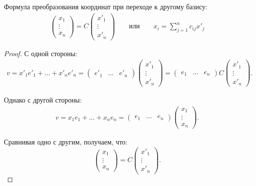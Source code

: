 \begin{Suggestion}
Формула преобразования координат при переходе к другому базису:
\begin{gather*}
\begin{pmatrix*}
x_1 \\
\vdots \\
x_n
\end{pmatrix*}
= C 
\begin{pmatrix*}
x'_1 \\
\vdots \\
x'_n
\end{pmatrix*}
\qquad \text{или} \qquad
x_i = \sum_{j = 1}^{n}c_{ij}x'_j
\end{gather*}
\end{Suggestion}

\begin{proof}
С одной стороны:
\begin{gather*}
v = x'_1 e'_1 + \ldots + x'_ne'_n = 
\begin{pmatrix*}
e'_1 & \ldots & e'_n
\end{pmatrix*} 
\begin{pmatrix*}
x'_1 \\
\vdots \\
x'_n
\end{pmatrix*} = 
\begin{pmatrix*}
e_1 & \ldots & e_n
\end{pmatrix*} C
\begin{pmatrix*}
x'_1 \\
\vdots \\
x'_n
\end{pmatrix*}.
\end{gather*}

Однако с другой стороны:
\begin{gather*}
v = x_1e_1 + \ldots + x_ne_n = 
\begin{pmatrix*}
e_1 & \ldots & e_n
\end{pmatrix*}
\begin{pmatrix*}
x_1 \\
\vdots \\
x_n
\end{pmatrix*}.
\end{gather*}

Сравнивая одно с другим, получаем, что:
\[
\begin{pmatrix*}
x_1 \\
\vdots \\
x_n
\end{pmatrix*} = C
\begin{pmatrix*}
x'_1 \\
\vdots \\
x'_n
\end{pmatrix*}.
\]
\end{proof}

